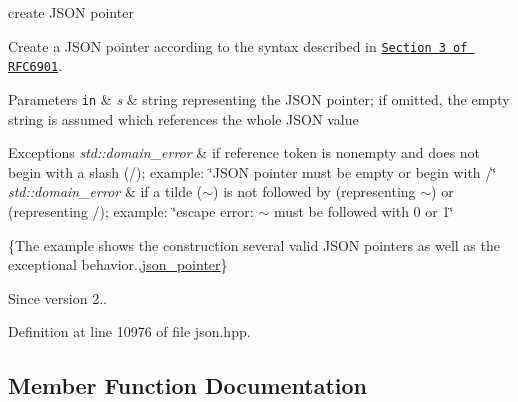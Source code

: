 create J\+S\+O\+N pointer 

Create a J\+S\+O\+N pointer according to the syntax described in \href{https://tools.ietf.org/html/rfc6901#section-3}{\tt Section 3 of R\+F\+C6901}.


\begin{DoxyParams}[1]{Parameters}
\mbox{\tt in}  & {\em s} & string representing the J\+S\+O\+N pointer; if omitted, the empty string is assumed which references the whole J\+S\+O\+N value\\
\hline
\end{DoxyParams}

\begin{DoxyExceptions}{Exceptions}
{\em std\+::domain\+\_\+error} & if reference token is nonempty and does not begin with a slash ({\ttfamily /}); example\+: {\ttfamily \char`\"{}\+J\+S\+O\+N pointer must be empty or
begin with /\char`\"{}} \\
\hline
{\em std\+::domain\+\_\+error} & if a tilde ({\ttfamily $\sim$}) is not followed by {} (representing {\ttfamily $\sim$}) or {} (representing {\ttfamily /}); example\+: {\ttfamily \char`\"{}escape error\+:
$\sim$ must be followed with 0 or 1\char`\"{}}\\
\hline
\end{DoxyExceptions}
\{The example shows the construction several valid J\+S\+O\+N pointers as well as the exceptional behavior.,\hyperlink{classnlohmann_1_1basic__json_1_1json__pointer}{json\+\_\+pointer}\}

\begin{DoxySince}{Since}
version 2.. 
\end{DoxySince}


Definition at line 10976 of file json.\+hpp.



\subsection{Member Function Documentation}
\hypertarget{classnlohmann_1_1basic__json_1_1json__pointer_a14fda25789660bdc3f2de652fec35f61}{}
